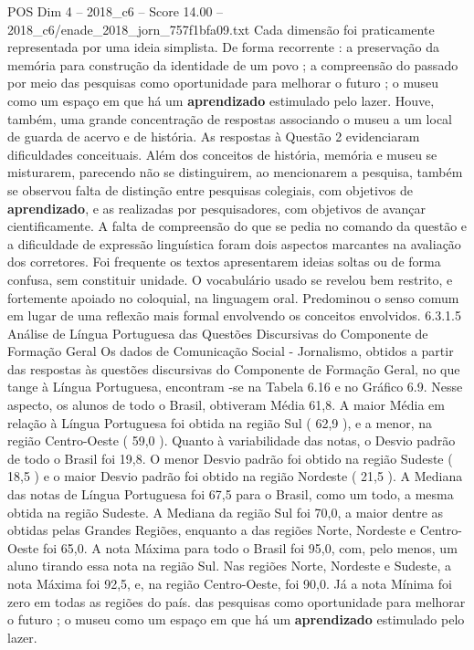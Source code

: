 \begin{textsample}{POS Dim 4 – 2018\_c6 – Score 14.00 – 2018\_c6/enade\_2018\_jorn\_757f1bfa09.txt}
Cada dimensão foi praticamente representada por uma ideia simplista.
De forma recorrente : a preservação da memória para construção da identidade de um povo ; a compreensão do passado por meio das pesquisas como oportunidade para melhorar o futuro ; o museu como um espaço em que há um \textbf{aprendizado} estimulado pelo lazer.
Houve, também, uma grande concentração de respostas associando o museu a um local de guarda de acervo e de história.
As respostas à Questão 2 evidenciaram dificuldades conceituais.
Além dos conceitos de história, memória e museu se misturarem, parecendo não se distinguirem, ao mencionarem a pesquisa, também se observou falta de distinção entre pesquisas colegiais, com objetivos de \textbf{aprendizado}, e as realizadas por pesquisadores, com objetivos de avançar cientificamente.
A falta de compreensão do que se pedia no comando da questão e a dificuldade de expressão linguística foram dois aspectos marcantes na avaliação dos corretores.
Foi frequente os textos apresentarem ideias soltas ou de forma confusa, sem constituir unidade.
O vocabulário usado se revelou bem restrito, e fortemente apoiado no coloquial, na linguagem oral.
Predominou o senso comum em lugar de uma reflexão mais formal envolvendo os conceitos envolvidos. 6.3.1.5 Análise de Língua Portuguesa das Questões Discursivas do Componente de Formação Geral Os dados de Comunicação Social - Jornalismo, obtidos a partir das respostas às questões discursivas do Componente de Formação Geral, no que tange à Língua Portuguesa, encontram -se na Tabela 6.16 e no Gráfico 6.9.
Nesse aspecto, os alunos de todo o Brasil, obtiveram Média 61,8.
A maior Média em relação à Língua Portuguesa foi obtida na região Sul ( 62,9 ), e a menor, na região Centro-Oeste ( 59,0 ).
Quanto à variabilidade das notas, o Desvio padrão de todo o Brasil foi 19,8.
O menor Desvio padrão foi obtido na região Sudeste ( 18,5 ) e o maior Desvio padrão foi obtido na região Nordeste ( 21,5 ).
A Mediana das notas de Língua Portuguesa foi 67,5 para o Brasil, como um todo, a mesma obtida na região Sudeste.
A Mediana da região Sul foi 70,0, a maior dentre as obtidas pelas Grandes Regiões, enquanto a das regiões Norte, Nordeste e Centro-Oeste foi 65,0.
A nota Máxima para todo o Brasil foi 95,0, com, pelo menos, um aluno tirando essa nota na região Sul.
Nas regiões Norte, Nordeste e Sudeste, a nota Máxima foi 92,5, e, na região Centro-Oeste, foi 90,0.
Já a nota Mínima foi zero em todas as regiões do país. das pesquisas como oportunidade para melhorar o futuro ; o museu como um espaço em que há um \textbf{aprendizado} estimulado pelo lazer.

\end{textsample}
